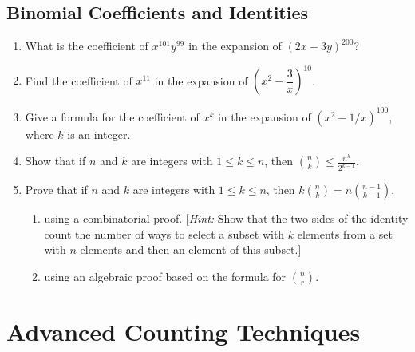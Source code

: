 \documentclass{../../cls/sig-alternate-05-2015}
\begin{document}
\subsection{Binomial Coefficients and Identities}

\begin{enumerate}
	\item What is the coefficient of $x^{101}y^{99}$ in the expansion of
	$(2x-3y)^{200}$?
	\item Find the coefficient of $x^{11}$ in the expansion of $(x^2-\dfrac{3}{x})^{10}$.
	
	\item Give a formula for the coefficient of $x^k$ in the expansion
	of $(x^2 - 1/x)^{100}$, where $k$ is an integer.
	
	\item Show that if $n$ and $k$ are integers with $1 \le k \le n$, then $\binom{n}{k} \le \frac{n^k}{2^{k - 1}}$.

	\item Prove that if $n$ and $k$ are integers with $1 \le k \le n$, then $k \binom{n}{k} = n \binom{n - 1}{k - 1}$,\begin{enumerate}
		\item using a combinatorial proof. [\textit{Hint:} Show that the two sides of the identity count the number of ways to select a subset with $k$ elements from a set with $n$ elements and then an element of this subset.]
		\item using an algebraic proof based on the formula for $\binom{n}{r}$.
	\end{enumerate}
\end{enumerate}

\section{Advanced Counting Techniques}
\end{document}
